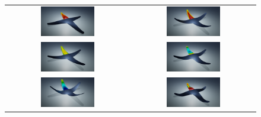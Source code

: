 \begin{figure}[hbtp]
	\centering
	\begin{tabular}{cc}
		\includegraphics[width=0.45\textwidth]{Figures/Example3/PressureNew/t1} &
		\includegraphics[width=0.45\textwidth]{Figures/Example3/PressureNew/t8}
		\\
		\includegraphics[width=0.45\textwidth]{Figures/Example3/PressureNew/t2} &
		\includegraphics[width=0.45\textwidth]{Figures/Example3/PressureNew/t10}
		\\
		\includegraphics[width=0.45\textwidth]{Figures/Example3/PressureNew/t4} &
		\includegraphics[width=0.45\textwidth]{Figures/Example3/PressureNew/t13}\\

\end{tabular}
\end{figure}
